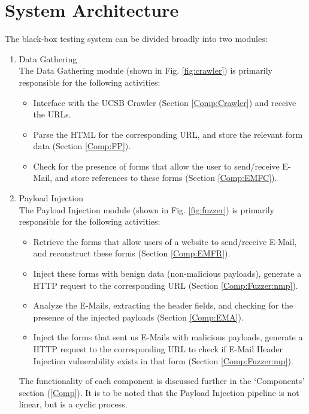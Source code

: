 \section{System Architecture}
\label{sys:arch}
The black-box testing system can be divided broadly into two modules:
\begin{enumerate}
	\item Data Gathering\\
		The Data Gathering module (shown in Fig. \ref{fig:crawler}) is primarily responsible for the following activities:
		\begin{itemize}
			\item Interface with the UCSB Crawler (Section \ref{Comp:Crawler}) and receive the URLs.
			\item Parse the HTML for the corresponding URL, and store the relevant form data (Section \ref{Comp:FP}).
			\item Check for the presence of forms that allow the user to send/receive E-Mail, and store references to these forms (Section \ref{Comp:EMFC}).
		\end{itemize} 
	\item Payload Injection\\
		The Payload Injection module (shown in Fig. \ref{fig:fuzzer}) is primarily responsible for the following activities:
		\begin{itemize}
			\item Retrieve the forms that allow users of a website to send/receive E-Mail, and reconstruct these forms (Section \ref{Comp:EMFR}).
			\item Inject these forms with benign data (non-malicious payloads), generate a HTTP request to the corresponding URL (Section \ref{Comp:Fuzzer:nmp}).
			\item Analyze the E-Mails, extracting the header fields, and checking for the presence of the injected payloads (Section \ref{Comp:EMA}).
			\item Inject the forms that sent us E-Mails with malicious payloads, generate a HTTP request to the corresponding URL to check if E-Mail Header Injection vulnerability exists in that form (Section \ref{Comp:Fuzzer:mp}).
		\end{itemize} 
	The functionality of each component is discussed further in the `Components' section (\ref{Comp}). It is to be noted that the Payload Injection pipeline is not linear, but is a cyclic process.
\end{enumerate}

